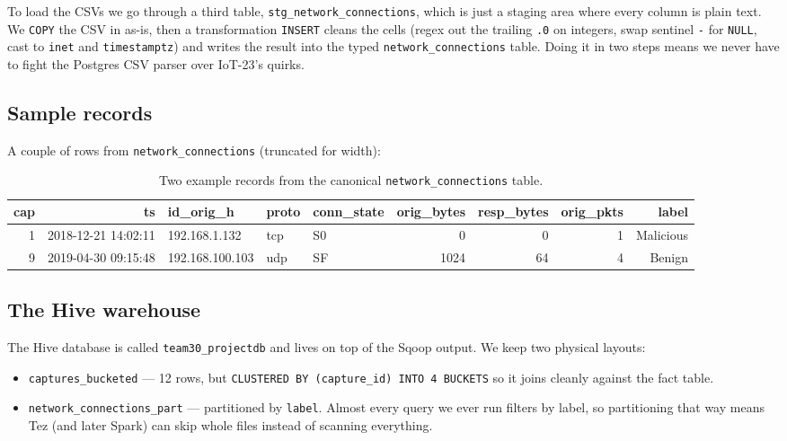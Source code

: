 \documentclass[11pt,a4paper]{article}
\begin{document}
To load the CSVs we go through a third table, \texttt{stg\_network\_connections},
which is just a staging area where every column is plain text. We
\texttt{COPY} the CSV in as-is, then a transformation \texttt{INSERT}
cleans the cells (regex out the trailing \texttt{.0} on integers, swap
sentinel \texttt{-} for \texttt{NULL}, cast to \texttt{inet} and
\texttt{timestamptz}) and writes the result into the typed
\texttt{network\_connections} table. Doing it in two steps means we never
have to fight the Postgres CSV parser over IoT-23's quirks.

\subsection{Sample records}

A couple of rows from \texttt{network\_connections} (truncated for width):

\begin{table}[H]
\centering
\scriptsize
\begin{tabular}{rrlllrrrr}
\toprule
cap & ts & id\_orig\_h & proto & conn\_state & orig\_bytes & resp\_bytes & orig\_pkts & label \\
\midrule
1  & 2018-12-21 14:02:11 & 192.168.1.132 & tcp & S0  & 0    & 0   & 1   & Malicious \\
9  & 2019-04-30 09:15:48 & 192.168.100.103 & udp & SF  & 1024 & 64  & 4   & Benign    \\
\bottomrule
\end{tabular}
\caption{Two example records from the canonical \texttt{network\_connections} table.}
\end{table}

\subsection{The Hive warehouse}

The Hive database is called \texttt{team30\_projectdb} and lives on top of
the Sqoop output. We keep two physical layouts:

\begin{itemize}[leftmargin=2em]
    \item \texttt{captures\_bucketed} --- 12 rows, but
    \texttt{CLUSTERED BY (capture\_id) INTO 4 BUCKETS} so it joins
    cleanly against the fact table.
    \item \texttt{network\_connections\_part} --- partitioned by
    \texttt{label}. Almost every query we ever run filters by label, so
    partitioning that way means Tez (and later Spark) can skip whole files
    instead of scanning everything.
\end{itemize}
\end{document}
